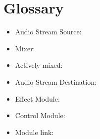 \chapter{Glossary}

\begin{itemize}
	\item Audio Stream Source:
	\item Mixer:
	\item Actively mixed:
	\item Audio Stream Destination:
	\item Effect Module:
	\item Control Module:
	\item Module link:
\end{itemize}	